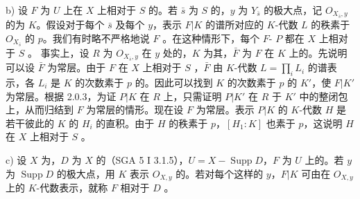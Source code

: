 b) 设 $F$ 为 $U$ 上在 $X$ 上相对于 $S$ 的。若 $\bar s$ 为 $S$ 的，$y$ 为 $Y_{\bar s}$ 的极大点，记 $O_{X_{\bar s},y}$ 的为 $K$。假设对于每个 $\bar s$ 及每个 $y$，表示 $F|K$ 的谱所对应的 $K$-代数 $L$ 的秩素于 $O_{X_{\bar s}}$ 的 $p$。我们有时略不严格地说 $F$ 。在这种情形下，每个 $F$- $P$ 都在 $X$ 上相对于 $S$ 。
事实上，设 $R$ 为 $O_{X_{\bar s},y}$ 在 $y$ 处的，$K$ 为其，$\bar F$ 为 $F$ 在 $K$ 上的。先说明可以设 $\bar F$ 为常层。由于 $F$ 在 $X$ 上相对于 $S$ ，$\bar F$ 由 $K$-代数 $L=\prod_iL_i$ 的谱表示，各 $L_i$ 是 $K$ 的次数素于 $p$ 的。因此可以找到 $K$ 的次数素于 $p$ 的 $K'$，使 $F|K'$ 为常层。根据 2.0.3，为证 $P|K$ 在 $R$ 上，只需证明 $P|K'$ 在 $R$ 于 $K'$ 中的整闭包上，从而归结到 $F$ 为常层的情形。现在设 $F$ 为常层。表示 $P|K$ 的 $K$-代数 $H$ 是若干彼此的 $K$ 的 $H_i$ 的直积。由于 $H$ 的秩素于 $p$，$[H_1:K]$ 也素于 $p$，这说明 $H$ 在 $X$ 上相对于 $S$ 。

c) 设 $X$ 为，$D$ 为 $X$ 的（SGA 5 I 3.1.5），$U=X-\operatorname{Supp}D$，$F$ 为 $U$ 上的。若 $y$ 为 $\operatorname{Supp}D$ 的极大点，用 $K$ 表示 $O_{X,y}$ 的。若对每个这样的 $y$，$F|K$ 可由在 $O_{X,y}$ 上的 $K$-代数表示，就称 $F$ 相对于 $D$ 。

